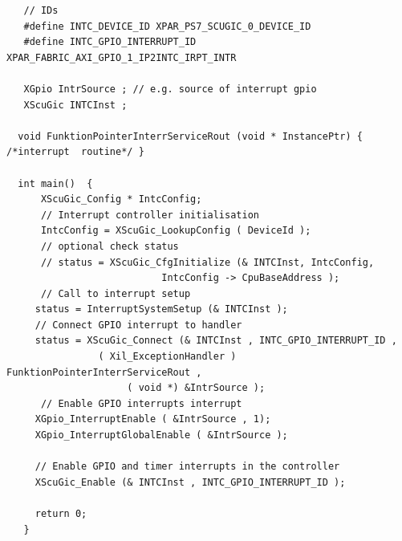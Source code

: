 \begin{verbatim}
   // IDs
   #define INTC_DEVICE_ID XPAR_PS7_SCUGIC_0_DEVICE_ID
   #define INTC_GPIO_INTERRUPT_ID XPAR_FABRIC_AXI_GPIO_1_IP2INTC_IRPT_INTR
 	
   XGpio IntrSource ; // e.g. source of interrupt gpio
   XScuGic INTCInst ;
   
  void FunktionPointerInterrServiceRout (void * InstancePtr) { /*interrupt  routine*/ }

  int main()  {
      XScuGic_Config * IntcConfig;
      // Interrupt controller initialisation
      IntcConfig = XScuGic_LookupConfig ( DeviceId );
      // optional check status
      // status = XScuGic_CfgInitialize (& INTCInst, IntcConfig,
                           IntcConfig -> CpuBaseAddress );
      // Call to interrupt setup       
     status = InterruptSystemSetup (& INTCInst );
     // Connect GPIO interrupt to handler
     status = XScuGic_Connect (& INTCInst , INTC_GPIO_INTERRUPT_ID ,
                ( Xil_ExceptionHandler ) FunktionPointerInterrServiceRout ,
                     ( void *) &IntrSource );
      // Enable GPIO interrupts interrupt
     XGpio_InterruptEnable ( &IntrSource , 1);
     XGpio_InterruptGlobalEnable ( &IntrSource );

     // Enable GPIO and timer interrupts in the controller
     XScuGic_Enable (& INTCInst , INTC_GPIO_INTERRUPT_ID );

     return 0;
   }
 \end{verbatim}